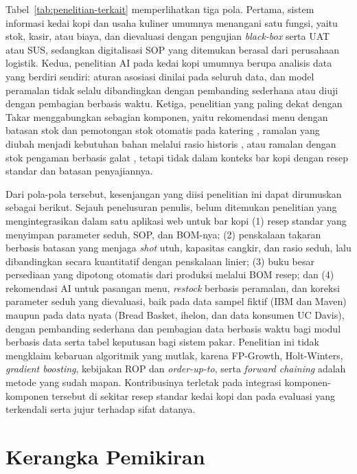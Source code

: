 Tabel~\ref{tab:penelitian-terkait} memperlihatkan tiga pola. Pertama, sistem informasi kedai kopi dan usaha kuliner umumnya menangani satu fungsi, yaitu stok, kasir, atau biaya, dan dievaluasi dengan pengujian \textit{black-box} serta UAT atau SUS, sedangkan digitalisasi SOP yang ditemukan berasal dari perusahaan logistik. Kedua, penelitian AI pada kedai kopi umumnya berupa analisis data yang berdiri sendiri: aturan asosiasi dinilai pada seluruh data, dan model peramalan tidak selalu dibandingkan dengan pembanding sederhana atau diuji dengan pembagian berbasis waktu. Ketiga, penelitian yang paling dekat dengan Takar menggabungkan sebagian komponen, yaitu rekomendasi menu dengan batasan stok dan pemotongan stok otomatis pada katering \citep*{pratama2026automatic}, ramalan yang diubah menjadi kebutuhan bahan melalui rasio historis \citep*{piewthongngam2026aienabled}, atau ramalan dengan stok pengaman berbasis galat \citep*{lauren2026optimizing}, tetapi tidak dalam konteks bar kopi dengan resep standar dan batasan penyajiannya.

Dari pola-pola tersebut, kesenjangan yang diisi penelitian ini dapat dirumuskan sebagai berikut. Sejauh penelusuran penulis, belum ditemukan penelitian yang mengintegrasikan dalam satu aplikasi web untuk bar kopi (1) resep standar yang menyimpan parameter seduh, SOP, dan BOM-nya; (2) penskalaan takaran berbasis batasan yang menjaga \textit{shot} utuh, kapasitas cangkir, dan rasio seduh, lalu dibandingkan secara kuantitatif dengan penskalaan linier; (3) buku besar persediaan yang dipotong otomatis dari produksi melalui BOM resep; dan (4) rekomendasi AI untuk pasangan menu, \textit{restock} berbasis peramalan, dan koreksi parameter seduh yang dievaluasi, baik pada data sampel fiktif (IBM dan Maven) maupun pada data nyata (Bread Basket, ihelon, dan data konsumen UC Davis), dengan pembanding sederhana dan pembagian data berbasis waktu bagi modul berbasis data serta tabel keputusan bagi sistem pakar. Penelitian ini tidak mengklaim kebaruan algoritmik yang mutlak, karena FP-Growth, Holt-Winters, \textit{gradient boosting}, kebijakan ROP dan \textit{order-up-to}, serta \textit{forward chaining} adalah metode yang sudah mapan. Kontribusinya terletak pada integrasi komponen-komponen tersebut di sekitar resep standar kedai kopi dan pada evaluasi yang terkendali serta jujur terhadap sifat datanya.

\section{Kerangka Pemikiran}
\label{sec:kerangka-pemikiran}


